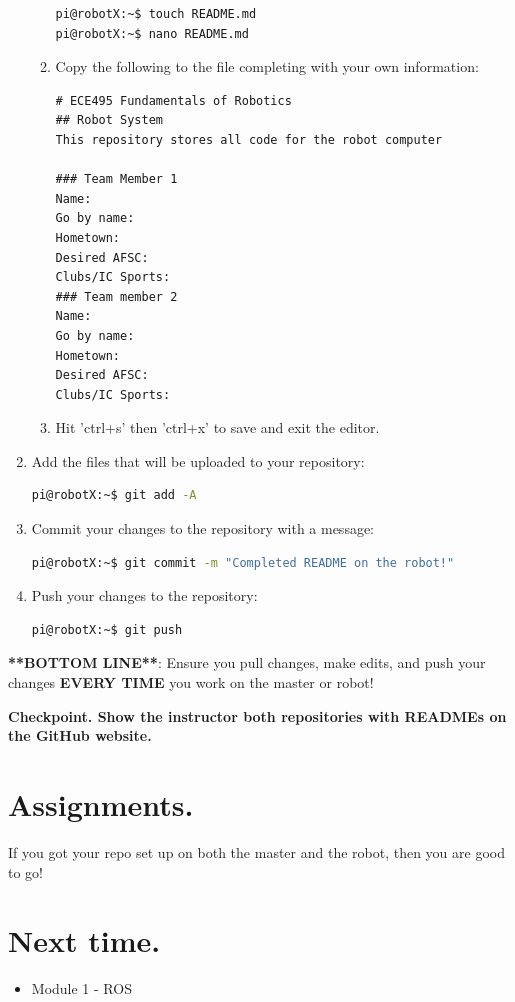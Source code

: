 \documentclass{handout}
\newcommand{\cmark}{\ding{51}}%
\newcommand{\done}{\rlap{$\square$}{\raisebox{2pt}{\large\hspace{1pt}\cmark}}%
	\hspace{-2.5pt}}
\begin{document}
\begin{enumerate}
\begin{enumerate}
\begin{lstlisting}[language=bash]
pi@robotX:~$ touch README.md
pi@robotX:~$ nano README.md	
\end{lstlisting}
		
		\item Copy the following to the file completing with your own information:
\begin{lstlisting}
# ECE495 Fundamentals of Robotics
## Robot System
This repository stores all code for the robot computer

### Team Member 1
Name:
Go by name:
Hometown:
Desired AFSC:
Clubs/IC Sports:
### Team member 2
Name:
Go by name:
Hometown:
Desired AFSC:
Clubs/IC Sports:
\end{lstlisting}
\item Hit 'ctrl+s' then 'ctrl+x' to save and exit the editor.
	\end{enumerate}
\item Add the files that will be uploaded to your repository:
\begin{lstlisting}[language=bash]
pi@robotX:~$ git add -A
\end{lstlisting}
\item Commit your changes to the repository with a message:
\begin{lstlisting}[language=bash]
pi@robotX:~$ git commit -m "Completed README on the robot!"
\end{lstlisting}
\item Push your changes to the repository:
\begin{lstlisting}[language=bash]
pi@robotX:~$ git push
\end{lstlisting}
\end{enumerate}

\textbf{**BOTTOM LINE**}: Ensure you pull changes, make edits, and push your changes \textbf{EVERY TIME} you work on the master or robot!

\textbf{Checkpoint. Show the instructor both repositories with READMEs on the GitHub website.}

\section{Assignments.}
\begin{todolist}
	\item[\done] If you got your repo set up on both the master and the robot, then you are good to go!
\end{todolist}

\section{Next time.}
	\begin{itemize}
		\item Module 1 - ROS
	\end{itemize}
\end{document}
